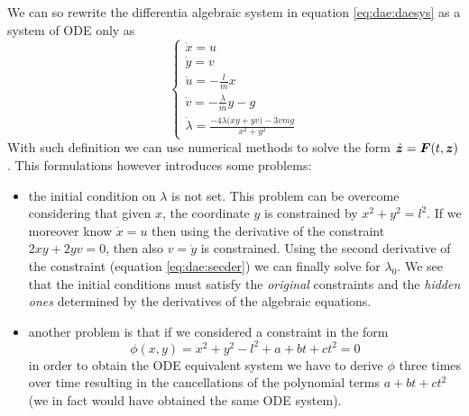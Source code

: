 	We can so rewrite the differentia algebraic system in equation \ref{eq:dae:daesys} as a system of ODE only as
	\[ \begin{cases}
		\dot x = u \\ \dot y = v \\ \dot u = - \frac l m x \\ \dot v = - \frac \lambda m y - g \\ \dot \lambda = \frac{-4\lambda\big(xy+yv\big) -3 vmg }{x^2+y^2} 
	\end{cases} \]
	With such definition we can use numerical methods to solve the form $\dot{\boldsymbol{z}} = \boldsymbol{F}(t,\boldsymbol{z})$. This formulations however introduces some problems:
	\begin{itemize}
		\item the initial condition on $\lambda$ is not set. This problem can be overcome considering that given $x$, the coordinate $y$ is constrained by $x^2 + y ^2 = l^2$. If we moreover know $\dot x = u$ then using the derivative of the constraint $2xy + 2yv = 0$, then also $v = \dot y$ is constrained. Using the second derivative of the constraint (equation \ref{eq:dae:secder}) we can finally solve for $\lambda_0$. We see that the initial conditions must satisfy the \textit{original} constraints and the \textit{hidden ones} determined by the derivatives of the algebraic equations. 
		
		\item another problem is that if we considered a constraint in the form
		\[ \phi(x,y) = x^2 + y^2 - l^2 +a + bt + ct^2 = 0 \]
		in order to obtain the ODE equivalent system we have to derive $\phi$ three times over time resulting in the cancellations of the polynomial  terms $a + bt+ ct^2$ (we in fact would have obtained the same ODE system).

	\end{itemize}

